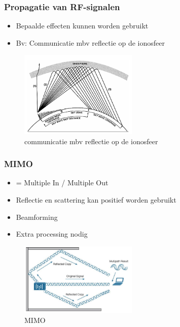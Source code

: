 \documentclass{article}
\begin{document}
\subsubsection{Propagatie van RF-signalen}

\begin{itemize}
    \item Bepaalde effecten kunnen worden gebruikt
    \item Bv: Communicatie mbv reflectie op de ionosfeer
\end{itemize}

\begin{figure}[H]
    \centering
    \includegraphics[width=0.5\textwidth]{Screenshot_20200309_125500.png}
    \caption{communicatie mbv reflectie op de ionosfeer}
\end{figure}

\subsubsection{MIMO}

\begin{itemize}
    \item = Multiple In / Multiple Out
    \item Reflectie en scattering kan positief worden gebruikt 
    \item Beamforming
    \item Extra processing nodig
\end{itemize}

\begin{figure}[H]
    \centering
    \includegraphics[width=0.5\textwidth]{Screenshot_20200309_125719.png}
    \caption{MIMO}
\end{figure}
\end{document}

